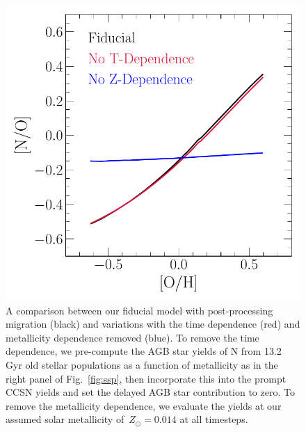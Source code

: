 \documentclass[ms.tex]{subfiles}
\begin{document}
\begin{figure}
\centering
\includegraphics[scale = 0.6]{t_z_dep_comp.pdf}
\caption{
A comparison between our fiducial model with post-processing migration (black)
and variations with the time dependence (red) and metallicity dependence 
removed (blue).
To remove the time dependence, we pre-compute the AGB star yields of N from
13.2 Gyr old stellar populations as a function of metallicity as in the right
panel of Fig.~\ref{fig:ssp}, then incorporate this into the prompt CCSN yields
and set the delayed AGB star contribution to zero.
To remove the metallicity dependence, we evaluate the yields at our assumed
solar metallicity of~$Z_\odot = 0.014$ at all timesteps.
}
\label{fig:t_z_dep_comp}
\end{figure}
\end{document}
